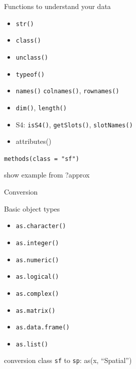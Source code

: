 \documentclass[8pt,ignorenonframetext,]{beamer}
\providecommand{\tightlist}{%
  \setlength{\itemsep}{0pt}\setlength{\parskip}{0pt}}
\begin{document}
\begin{frame}[fragile]{Functions to understand your data}

\begin{itemize}
\tightlist
\item
  \texttt{str()}
\item
  \texttt{class()}
\item
  \texttt{unclass()}
\item
  \texttt{typeof()}
\item
  \texttt{names()} \texttt{colnames()}, \texttt{rownames()}
\item
  \texttt{dim()}, \texttt{length()}
\item
  S4: \texttt{isS4()}, \texttt{getSlots()}, \texttt{slotNames()}
\item
  attributes()
\end{itemize}

\texttt{methods(class\ =\ "sf")}

show example from ?approx

\end{frame}

\begin{frame}[fragile]{Conversion}

\begin{block}{Basic object types}

\begin{itemize}
\tightlist
\item
  \texttt{as.character()}
\item
  \texttt{as.integer()}
\item
  \texttt{as.numeric()}
\item
  \texttt{as.logical()}
\item
  \texttt{as.complex()}
\item
  \texttt{as.matrix()}
\item
  \texttt{as.data.frame()}
\item
  \texttt{as.list()}
\end{itemize}

conversion class \texttt{sf} to \texttt{sp}: as(x, ``Spatial'')

\end{block}

\end{frame}
\end{document}
